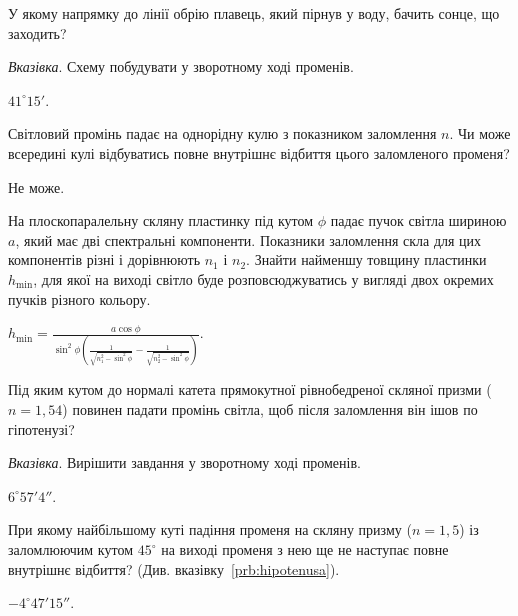 \begin{problem}
У якому напрямку до лінії обрію плавець, який пірнув у воду, бачить
сонце, що заходить?

\medskip

\emph{Вказівка}. Схему побудувати у зворотному ході променів.
\begin{solution}
	$41^\circ15'$.
\end{solution}
\end{problem}

\begin{problem}
Світловий промінь падає на однорідну кулю з показником заломлення
$n$. Чи може всередині кулі відбуватись повне внутрішнє відбиття цього
заломленого променя?
\begin{solution}
	Не може.
\end{solution}
\end{problem}

\begin{problem}
На плоскопаралельну скляну пластинку під кутом $\phi$ падає пучок світла
шириною $a$, який має дві спектральні компоненти. Показники
заломлення скла для цих компонентів різні і дорівнюють $n_1$ і $n_2$. Знайти
найменшу товщину пластинки $h_{\min}$, для якої на виході світло буде
розповсюджуватись у вигляді двох окремих пучків різного кольору.
\begin{solution}
	$h_{\min} = \frac{a\cos\phi}{\sin^2\phi \left( \frac{1}{\sqrt{n_1^2 - \sin^2\phi}}  - \frac{1}{\sqrt{n_2^2 - \sin^2\phi}} \right) }$.
\end{solution}
\end{problem}


\begin{problem}\label{prb:hipotenusa}
Під яким кутом до нормалі катета прямокутної рівнобедреної скляної
призми ($n = 1,54$) повинен падати промінь світла, щоб після заломлення
він ішов по гіпотенузі?

\medskip

\emph{Вказівка}. Вирішити завдання у зворотному ході променів.
\begin{solution}
	$6^\circ 57'4''$.
\end{solution}
\end{problem}

\begin{problem}
При якому найбільшому куті падіння променя на скляну призму ($n =
	1,5$) із заломлюючим кутом $45^\circ$ на виході променя з нею ще не наступає
повне внутрішнє відбиття? (Див. вказівку~\ref{prb:hipotenusa}).
\begin{solution}
	$-4^\circ47'15''$.
\end{solution}
\end{problem}


